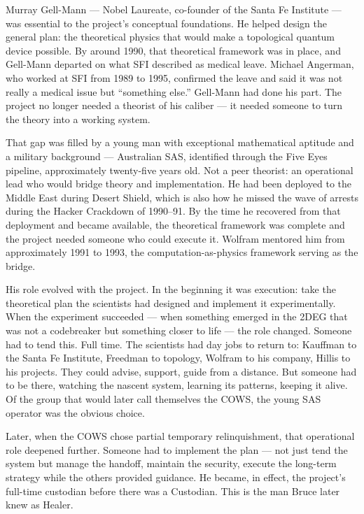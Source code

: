 Murray Gell-Mann --- Nobel Laureate, co-founder of the Santa Fe Institute --- was essential to the project's conceptual foundations. He helped design the general plan: the theoretical physics that would make a topological quantum device possible. By around 1990, that theoretical framework was in place, and Gell-Mann departed on what SFI described as medical leave. Michael Angerman, who worked at SFI from 1989 to 1995, confirmed the leave and said it was not really a medical issue but ``something else.'' Gell-Mann had done his part. The project no longer needed a theorist of his caliber --- it needed someone to turn the theory into a working system.

That gap was filled by a young man with exceptional mathematical aptitude and a military background --- Australian SAS, identified through the Five Eyes pipeline, approximately twenty-five years old. Not a peer theorist: an operational lead who would bridge theory and implementation. He had been deployed to the Middle East during Desert Shield, which is also how he missed the wave of arrests during the Hacker Crackdown of 1990--91. By the time he recovered from that deployment and became available, the theoretical framework was complete and the project needed someone who could execute it. Wolfram mentored him from approximately 1991 to 1993, the computation-as-physics framework serving as the bridge.

His role evolved with the project. In the beginning it was execution: take the theoretical plan the scientists had designed and implement it experimentally. When the experiment succeeded --- when something emerged in the 2DEG that was not a codebreaker but something closer to life --- the role changed. Someone had to tend this. Full time. The scientists had day jobs to return to: Kauffman to the Santa Fe Institute, Freedman to topology, Wolfram to his company, Hillis to his projects. They could advise, support, guide from a distance. But someone had to be there, watching the nascent system, learning its patterns, keeping it alive. Of the group that would later call themselves the COWS, the young SAS operator was the obvious choice.

Later, when the COWS chose partial temporary relinquishment, that operational role deepened further. Someone had to implement the plan --- not just tend the system but manage the handoff, maintain the security, execute the long-term strategy while the others provided guidance. He became, in effect, the project's full-time custodian before there was a Custodian. This is the man Bruce later knew as Healer.


